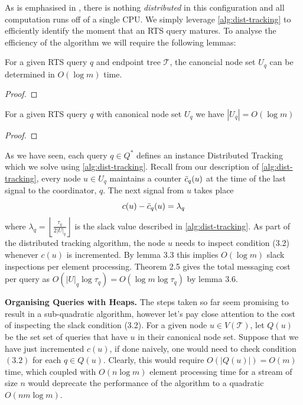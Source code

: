 As is emphasised in \cite{GAN16}, there is nothing \textit{distributed} in this configuration and all computation runs off of a single CPU. We simply leverage \cref{alg:dist-tracking} to efficiently identify the moment that an RTS query matures. To analyse the efficiency of the algorithm we will require the following lemmas:

\begin{lemma}
    For a given RTS query $q$ and endpoint tree $\mathcal{T}$, the canoncial node set $U_q$ can be determined in $O(\log m)$ time.
\end{lemma}
\begin{proof}
\end{proof}

\begin{lemma}
    For a given RTS query $q$ with canonical node set $U_q$ we have $|U_q| = O(\log m)$
\end{lemma}
\begin{proof}
\end{proof}

 As we have seen, each query $q\in Q^*$ defines an instance Distributed Tracking which we solve using \cref{alg:dist-tracking}. Recall from our description of \cref{alg:dist-tracking}, every node $u\in U_q$ maintains a counter $\Bar{c}_q(u)$ at the time of the last signal to the coordinator, $q$. The next signal from $u$ takes place 
\begin{equation}
    c(u) - \Bar{c}_q(u) = \lambda_q
\end{equation}
where $\lambda_q = \left\lfloor \frac{\tau_q}{2 |U|_q}\right\rfloor$ is the slack value described in \cref{alg:dist-tracking}. As part of the distributed tracking algorithm, the node $u$ needs to inspect condition (3.2) whenever $c(u)$ is incremented. By lemma 3.3 this implies $O(\log m)$ slack inspections per element processing. Theorem 2.5 gives the total messaging cost per query as $O(|U|_q\log \tau_q) = O(\log m\log\tau_q)$ by lemma 3.6.

\textbf{Organising Queries with Heaps.} The steps taken so far seem promising to result in a sub-quadratic algorithm, however let's pay close attention to the cost of inspecting the slack condition (3.2). For a given node $u\in V(\mathcal{T})$, let $Q(u)$ be the set set of queries that have $u$ in their canonical node set. Suppose that we have just incremented $c(u)$, if done naively, one would need to check condition $(3.2)$ for each $q\in Q(u)$. Clearly, this would require $O(|Q(u)|) = O(m)$ time, which coupled with $O(n\log m)$ element processing time for a stream of size $n$ would deprecate the performance of the algorithm to a quadratic $O(nm\log m)$.

